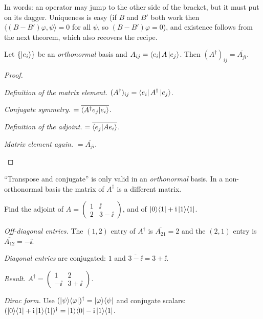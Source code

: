 In words: an operator may jump to the other side of the bracket, but it must put on its dagger. Uniqueness is easy (if $B$ and $B'$ both work then $\langle(B-B')\varphi,\psi\rangle=0$ for all $\psi$, so $(B-B')\varphi=0$), and existence follows from the next theorem, which also recovers the recipe.

\begin{theorem}\label{thm:adjmatrix}
  Let $\{\left|e_i\right\rangle\}$ be an \emph{orthonormal} basis and $A_{ij}=\left\langle e_i\right|A\left|e_j\right\rangle$. Then $(A^\dagger)_{ij}=\overline{A_{ji}}$.
\end{theorem}
\begin{proof}
  \begin{steps}
    \item \emph{Definition of the matrix element.} $(A^\dagger)_{ij}=\left\langle e_i\right|A^\dagger\left|e_j\right\rangle$.
    \item \emph{Conjugate symmetry.} $=\overline{\left\langle A^\dagger e_j\middle|e_i\right\rangle}$.
    \item \emph{Definition of the adjoint.} $=\overline{\left\langle e_j\middle|Ae_i\right\rangle}$.
    \item \emph{Matrix element again.} $=\overline{A_{ji}}$. \qedhere
  \end{steps}
\end{proof}

\begin{pitfall}
  ``Transpose and conjugate'' is only valid in an \emph{orthonormal} basis. In a non-orthonormal basis the matrix of $A^\dagger$ is a different matrix.
\end{pitfall}

\begin{example}\label{ex:adjoint}
  Find the adjoint of $A=\begin{pmatrix}1&\ii\\2&3-\ii\end{pmatrix}$, and of $\left|0\right\rangle\!\left\langle1\right|+\mathrm{i}\left|1\right\rangle\!\left\langle1\right|$.
\end{example}
\begin{solution}
  \begin{steps}
    \item \emph{Off-diagonal entries.} The $(1,2)$ entry of $A^\dagger$ is $\overline{A_{21}}=2$ and the $(2,1)$ entry is $\overline{A_{12}}=-\ii$.
    \item \emph{Diagonal entries} are conjugated: $1$ and $\overline{3-\ii}=3+\ii$.
    \item \emph{Result.} $A^\dagger=\begin{pmatrix}1&2\\-\ii&3+\ii\end{pmatrix}$.
    \item \emph{Dirac form.} Use $(\left|\psi\right\rangle\!\left\langle\varphi\right|)^\dagger=\left|\varphi\right\rangle\!\left\langle\psi\right|$ and conjugate scalars: $(\left|0\right\rangle\!\left\langle1\right|+\mathrm{i}\left|1\right\rangle\!\left\langle1\right|)^\dagger=\left|1\right\rangle\!\left\langle0\right|-\mathrm{i}\left|1\right\rangle\!\left\langle1\right|$.
  \end{steps}
\end{solution}

